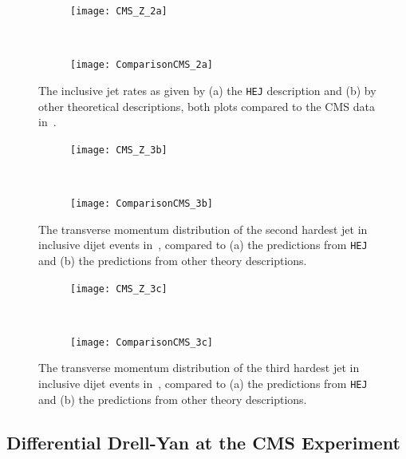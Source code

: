 		\begin{figure}[h]
		  \centering
		  \begin{subfigure}[b]{0.46\textwidth}
		    \texttt{[image: CMS\_Z\_2a]}
		    \caption{}
		    \label{fig:HEJ_CMS_2a}
		  \end{subfigure}
		  ~
		  \begin{subfigure}[b]{0.48\textwidth}
		    \texttt{[image: ComparisonCMS\_2a]}
		    \caption{}
		    \label{fig:MC_CMS_2a}
		  \end{subfigure}
		  \caption{The inclusive jet rates as given by (a) the \texttt{HEJ} description and (b)
		    by other theoretical descriptions, both plots compared to the CMS data in~\cite{Khachatryan:2014zya}.}
		  \label{fig:CMS_2a}

		  \begin{subfigure}[b]{0.46\textwidth}
		    \texttt{[image: CMS\_Z\_3b]}
		    \caption{}
		    \label{fig:HEJ_CMS_7b}
		  \end{subfigure}
		  ~
		  \begin{subfigure}[b]{0.48\textwidth}
		    \texttt{[image: ComparisonCMS\_3b]}
		    \caption{}
		    \label{fig:MC_CMS_7b}
		  \end{subfigure}
		  \caption{The transverse momentum distribution of the second hardest jet in
		    inclusive dijet events in~\cite{Khachatryan:2014zya}, compared to (a) the
		    predictions from \texttt{HEJ} and (b) the predictions from other theory descriptions.}
		  \label{fig:CMS_3b}
		\end{figure}

		\begin{figure}[H]
		  \centering
		  \begin{subfigure}[b]{0.46\textwidth}
		    \texttt{[image: CMS\_Z\_3c]}
		    \caption{}
		    \label{fig:HEJ_CMS_7b}
		  \end{subfigure}
		  ~
		  \begin{subfigure}[b]{0.48\textwidth}
		    \texttt{[image: ComparisonCMS\_3c]}
		    \caption{}
		    \label{fig:MC_CMS_7b}
		  \end{subfigure}
		  \caption{The transverse momentum distribution of the third hardest jet in
		    inclusive dijet events in~\cite{Khachatryan:2014zya}, compared to (a) the
		    predictions from \texttt{HEJ} and (b) the predictions from other theory descriptions.}
		  \label{fig:CMS_3c}
		\end{figure}

	\subsection{Differential Drell-Yan at the CMS Experiment}
		\label{sub:CMS2}

